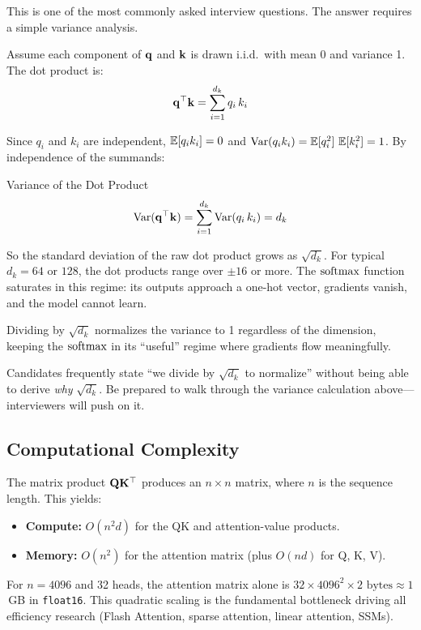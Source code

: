 This is one of the most commonly asked interview questions.  The answer
requires a simple variance analysis.

Assume each component of $\mathbf{q}$ and $\mathbf{k}$ is drawn i.i.d.\ with mean 0 and
variance 1.  The dot product is:
\[
    \mathbf{q}^\top \mathbf{k} = \sum_{i=1}^{d_k} q_i \, k_i
\]

Since $q_i$ and $k_i$ are independent, $\operatorname{\mathbb{E}}[q_i k_i] = 0$ and
$\operatorname{Var}(q_i k_i) = \operatorname{\mathbb{E}}[q_i^2]\,\operatorname{\mathbb{E}}[k_i^2] = 1$.  By independence of the summands:

\begin{mathresult}{Variance of the Dot Product}
\[
    \operatorname{Var}(\mathbf{q}^\top \mathbf{k}) = \sum_{i=1}^{d_k} \operatorname{Var}(q_i\, k_i) = d_k
\]
\end{mathresult}

So the standard deviation of the raw dot product grows as $\sqrt{d_k}$.  For
typical $d_k = 64$ or $128$, the dot products range over $\pm 16$ or more.
The $\operatorname{softmax}$ function saturates in this regime: its outputs approach a one-hot
vector, gradients vanish, and the model cannot learn.

Dividing by $\sqrt{d_k}$ normalizes the variance to 1 regardless of the
dimension, keeping the $\operatorname{softmax}$ in its ``useful'' regime where gradients
flow meaningfully.

\begin{warningbox}
Candidates frequently state ``we divide by $\sqrt{d_k}$ to normalize'' without
being able to derive \emph{why} $\sqrt{d_k}$.  Be prepared to walk through the
variance calculation above---interviewers will push on it.
\end{warningbox}

\subsection{Computational Complexity}

The matrix product $\mathbf{Q} \mathbf{K}^\top$ produces an $n \times n$ matrix, where $n$
is the sequence length.  This yields:

\begin{itemize}
    \item \textbf{Compute:} $O(n^2 d)$ for the QK and attention-value products.
    \item \textbf{Memory:} $O(n^2)$ for the attention matrix (plus $O(nd)$
          for Q, K, V).
\end{itemize}

For $n = 4096$ and 32 heads, the attention matrix alone is
$32 \times 4096^2 \times 2\text{ bytes} \approx 1$\,GB in \texttt{float16}.
This quadratic scaling is the fundamental bottleneck driving all efficiency
research (Flash Attention, sparse attention, linear attention, SSMs).

